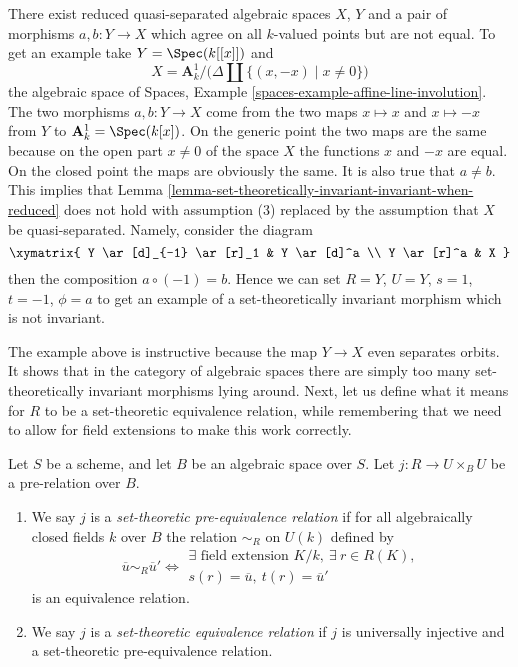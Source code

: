 \begin{example}
\label{example-not-invariant}
There exist reduced quasi-separated algebraic spaces $X$, $Y$ and a pair of
morphisms $a, b : Y \to X$ which agree on all $k$-valued points but are not
equal. To get an example take $Y = \Spec(k[[x]])$ and
$$
X = \mathbf{A}^1_k \Big/ \big(\Delta \amalg \{(x, -x) \mid x \not = 0\}\big)
$$
the algebraic space of
Spaces, Example \ref{spaces-example-affine-line-involution}.
The two morphisms $a, b : Y \to X$
come from the two maps $x \mapsto x$ and $x \mapsto -x$
from $Y$ to $\mathbf{A}^1_k = \Spec(k[x])$. On the generic point
the two maps are the same because on the open part $x \not = 0$ of the
space $X$ the functions $x$ and $-x$ are equal. On the closed point
the maps are obviously the same. It is also true that $a \not = b$.
This implies that
Lemma \ref{lemma-set-theoretically-invariant-invariant-when-reduced}
does not hold with assumption (3) replaced by the assumption that $X$
be quasi-separated. Namely, consider the diagram
$$
\xymatrix{
Y \ar[d]_{-1} \ar[r]_1 & Y \ar[d]^a \\
Y \ar[r]^a & X
}
$$
then the composition $a \circ (-1) = b$. Hence we can set $R = Y$,
$U = Y$, $s = 1$, $t = -1$, $\phi = a$ to get an example of a set-theoretically
invariant morphism which is not invariant.
\end{example}

\noindent
The example above is instructive because the map $Y \to X$ even separates
orbits. It shows that in the category of algebraic spaces there are simply
too many set-theoretically invariant morphisms lying around. Next, let us
define what it means for $R$ to be a set-theoretic equivalence relation, while
remembering that we need to allow for field extensions to make this work
correctly.

\begin{definition}
\label{definition-set-theoretic-equivalence}
Let $S$ be a scheme, and let $B$ be an algebraic space over $S$.
Let $j : R \to U \times_B U$ be a pre-relation over $B$.
\begin{enumerate}
\item We say $j$ is a {\it set-theoretic pre-equivalence relation} if
for all algebraically closed fields $k$ over $B$ the relation
$\sim_R$ on $U(k)$ defined by
$$
\overline{u} \sim_R \overline{u}'
\Leftrightarrow
\begin{matrix}
\exists\text{ field extension }K/k, \ \exists\ r \in R(K), \\
s(r) = \overline{u}, \ t(r) = \overline{u}'
\end{matrix}
$$
is an equivalence relation.
\item We say $j$ is a {\it set-theoretic equivalence relation}
if $j$ is universally injective and a set-theoretic pre-equivalence
relation.
\end{enumerate}
\end{definition}

